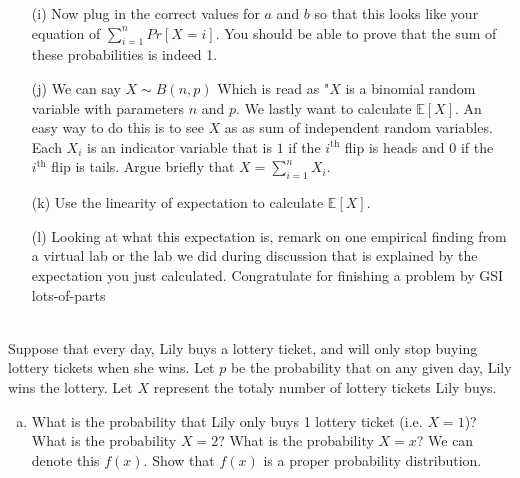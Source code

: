 \documentclass[]{article}
\newif\ifsolutions
\renewcommand{\answer}[1]{{\color{mydarkblue}\textbf{Solution:}#1}}
\begin{document}
\begin{qunlist}
\begin{enumerate}
\qpart
\item[(i)] Now plug in the correct values for $a$ and $b$ so that this looks like your equation of $\sum\nolimits_{i=1}^n Pr[X=i]$. You should be able to prove that the sum of these probabilities is indeed 1.
\qpart
\item[(j)] We can say $X \sim B(n,p)$ Which is read as "$X$ is a binomial random variable with parameters $n$ and $p$. We lastly want to calculate $\mathbb{E}[X]$. An easy way to do this is to see $X$ as as sum of independent random variables. Each $X_i$ is an indicator variable that is $1$ if the $i^{\text{th}}$ flip is heads and $0$ if the $i^{\text{th}}$ flip is tails. Argue briefly that $X = \sum\nolimits_{i=1}^nX_i$.
\qpart
\item[(k)] Use the linearity of expectation to calculate $\mathbb{E}[X]$.
\qpart
\item[(l)] Looking at what this expectation is, remark on one empirical finding from a virtual lab or the lab we did during discussion that is explained by the expectation you just calculated. Congratulate for finishing a problem by GSI lots-of-parts 
\end{enumerate}



 \\ Suppose that every day, Lily buys a lottery ticket, and will only stop buying lottery tickets when she wins.  Let $p$ be the probability that on any given day, Lily wins the lottery.  Let $X$ represent the totaly number of lottery tickets Lily buys.

\begin{enumerate}[a)]

\qpart
\item What is the probability that Lily only buys 1 lottery ticket (i.e. $X=1$)?  What is the probability $X=2$?  What is the probability $X=x$?  We can denote this $f(x)$.
Show that $f(x)$ is a proper probability distribution.

\ifsolutions{ \answer{ The probability of getting $(x-1)$ non-winning lottery tickets is $(1-p)^{x-1}$. Therefore the probability of getting $(x-1)$ non-winning tickets, then a winning ticket is
	\[ P(X=x) = (1-p)^{x-1} p. \]
	To show this is a valid probability distribution, we need to make sure the sum of $f(x)$ over all possible $x$ is 1. Using the formula for an infinite geometric series,
	\[ \sum_{x=1}^{\infty} f(x) = p \sum_{x=1}^{\infty} (1-p)^{x-1} = p \cdot \frac{1}{1-(1-p)} = 1. \]
}}\fi


\end{enumerate}
\end{qunlist}
\end{document}
